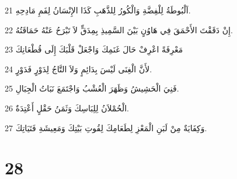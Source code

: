 \par 21 اَلْبُوطَةُ لِلْفِضَّةِ وَالْكُورُ لِلذَّهَبِ كَذَا الإِنْسَانُ لِفَمِ مَادِحِهِ.
\par 22 إِنْ دَقَقْتَ الأَحْمَقَ فِي هَاوُنٍ بَيْنَ السَّمِيذِ بِمِدَقٍّ لاَ تَبْرَحُ عَنْهُ حَمَاقَتُهُ.
\par 23 مَعْرِفَةً اعْرِفْ حَالَ غَنَمِكَ وَاجْعَلْ قَلْبَكَ إِلَى قُطْعَانِكَ
\par 24 لأَنَّ الْغِنَى لَيْسَ بِدَائِمٍ وَلاَ التَّاجُ لِدَوْرٍ فَدَوْرٍ.
\par 25 فَنِيَ الْحَشِيشُ وَظَهَرَ الْعُشْبُ وَاجْتَمَعَ نَبَاتُ الْجِبَالِ.
\par 26 الْحُمْلاَنُ لِلِبَاسِكَ وَثَمَنُ حَقْلٍ أَعْتِدَةٌ.
\par 27 وَكِفَايَةٌ مِنْ لَبَنِ الْمَعْزِ لِطَعَامِكَ لِقُوتِ بَيْتِكَ وَمَعِيشَةِ فَتَيَاتِكَ.

\chapter{28}

